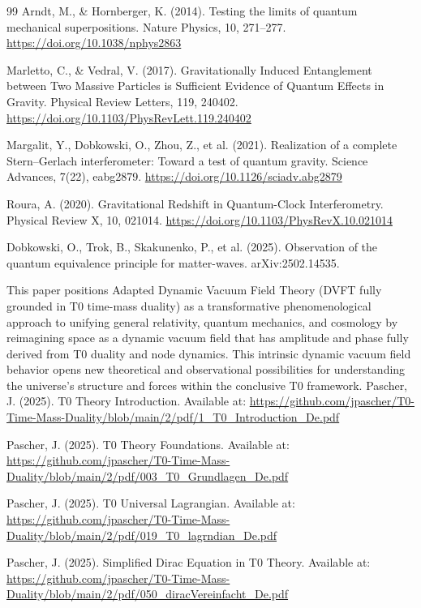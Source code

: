 \begin{thebibliography}{99}
		Arndt, M., \& Hornberger, K. (2014). Testing the limits of quantum mechanical superpositions. Nature Physics, 10, 271–277. \url{https://doi.org/10.1038/nphys2863}
		
		Marletto, C., \& Vedral, V. (2017). Gravitationally Induced Entanglement between Two Massive Particles is Sufficient Evidence of Quantum Effects in Gravity. Physical Review Letters, 119, 240402. \url{https://doi.org/10.1103/PhysRevLett.119.240402}
		
		Margalit, Y., Dobkowski, O., Zhou, Z., et al. (2021). Realization of a complete Stern–Gerlach interferometer: Toward a test of quantum gravity. Science Advances, 7(22), eabg2879. \url{https://doi.org/10.1126/sciadv.abg2879}
		
		Roura, A. (2020). Gravitational Redshift in Quantum-Clock Interferometry. Physical Review X, 10, 021014. \url{https://doi.org/10.1103/PhysRevX.10.021014}
		
		Dobkowski, O., Trok, B., Skakunenko, P., et al. (2025). Observation of the quantum equivalence principle for matter-waves. arXiv:2502.14535.
		
		This paper positions Adapted Dynamic Vacuum Field Theory (DVFT fully grounded in T0 time-mass duality) as a transformative phenomenological approach to unifying general relativity, quantum mechanics, and cosmology by reimagining space as a dynamic vacuum field that has amplitude and phase fully derived from T0 duality and node dynamics. This intrinsic dynamic vacuum field behavior opens new theoretical and observational possibilities for understanding the universe’s structure and forces within the conclusive T0 framework.
		Pascher, J. (2025). T0 Theory Introduction. Available at: \url{https://github.com/jpascher/T0-Time-Mass-Duality/blob/main/2/pdf/1_T0_Introduction_De.pdf}
		
		Pascher, J. (2025). T0 Theory Foundations. Available at: \url{https://github.com/jpascher/T0-Time-Mass-Duality/blob/main/2/pdf/003_T0_Grundlagen_De.pdf}
		
		Pascher, J. (2025). T0 Universal Lagrangian. Available at: \url{https://github.com/jpascher/T0-Time-Mass-Duality/blob/main/2/pdf/019_T0_lagrndian_De.pdf}
		
		Pascher, J. (2025). Simplified Dirac Equation in T0 Theory. Available at: \url{https://github.com/jpascher/T0-Time-Mass-Duality/blob/main/2/pdf/050_diracVereinfacht_De.pdf}
		

\end{thebibliography}
